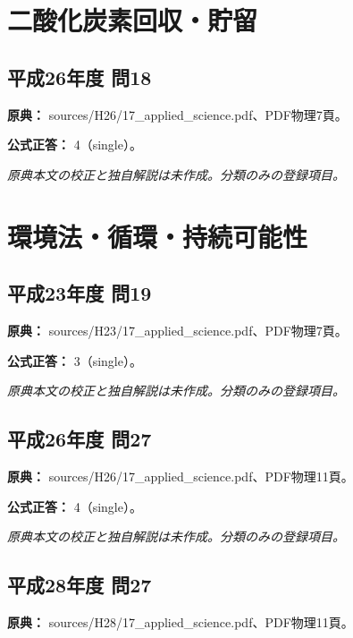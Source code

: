 \section{二酸化炭素回収・貯留}

\subsection{平成26年度 問18}
\label{q:h26-reg-applied-18}

\noindent\textbf{原典：} sources/H26/17\_applied\_science.pdf、PDF物理7頁。

\textbf{公式正答：} 4（single）。

\par\textit{原典本文の校正と独自解説は未作成。分類のみの登録項目。}

\section{環境法・循環・持続可能性}

\subsection{平成23年度 問19}
\label{q:h23-reg-applied-19}

\noindent\textbf{原典：} sources/H23/17\_applied\_science.pdf、PDF物理7頁。

\textbf{公式正答：} 3（single）。

\par\textit{原典本文の校正と独自解説は未作成。分類のみの登録項目。}

\subsection{平成26年度 問27}
\label{q:h26-reg-applied-27}

\noindent\textbf{原典：} sources/H26/17\_applied\_science.pdf、PDF物理11頁。

\textbf{公式正答：} 4（single）。

\par\textit{原典本文の校正と独自解説は未作成。分類のみの登録項目。}

\subsection{平成28年度 問27}
\label{q:h28-reg-applied-27}

\noindent\textbf{原典：} sources/H28/17\_applied\_science.pdf、PDF物理11頁。

